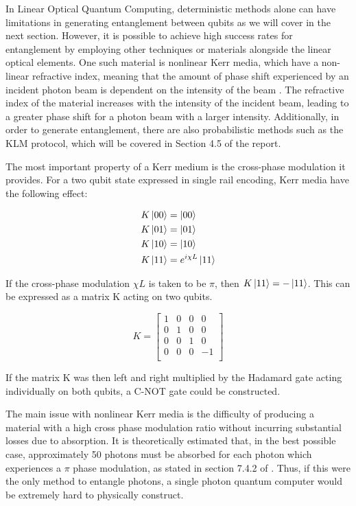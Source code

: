 In Linear Optical Quantum Computing, deterministic methods alone can have limitations in generating entanglement between qubits as we will cover in the next section. However, it is possible to achieve high success rates for entanglement  by employing other techniques or materials alongside the linear optical elements. One such material is nonlinear Kerr media, which have a non-linear refractive index, meaning that the amount of phase shift experienced by an incident photon beam is dependent on the intensity of the beam \cite{nielsen_chuang_2010}. The refractive index of the material increases with the intensity of the incident beam, leading to a greater phase shift for a photon beam with a larger intensity. Additionally, in order to generate entanglement, there are also probabilistic methods such as the KLM protocol, which will be covered in Section 4.5 of the report.



\par 
The most important property of a Kerr medium is the cross-phase modulation it provides. For a two qubit state expressed in single rail encoding, Kerr media have the following effect:

\begin{align*} 
    K \ket{00} &=  \ket{00}\\
    K \ket{01} &=  \ket{01}\\
    K \ket{10} &=  \ket{10}\\
    K \ket{11} &=  e^{i\chi L}\ket{11}
    \end{align*}
    
If the cross-phase modulation $\chi L$ is taken to be $\pi$, then $K \ket{11} =  -\ket{11}$. This can be expressed as a matrix K acting on two qubits.

$$K = \begin{bmatrix}
    1 & 0 & 0 & 0\\
    0 & 1 & 0 & 0\\
    0 & 0 & 1 & 0\\
    0 & 0 & 0 & -1\\
    \end{bmatrix}$$

If the matrix K was then left and right multiplied by the Hadamard gate acting individually on both qubits, a C-NOT gate could be constructed. 

The main issue with nonlinear Kerr media is the difficulty of producing a material with a high cross phase modulation ratio without incurring substantial losses due to absorption. It is theoretically estimated that, in the best possible case, approximately 50 photons must be absorbed for each photon which experiences a $\pi$ phase modulation, as stated in section 7.4.2 of \cite{nielsen_chuang_2010}. Thus, if this were the only method to entangle photons, a single photon quantum computer would be extremely hard to physically construct.



